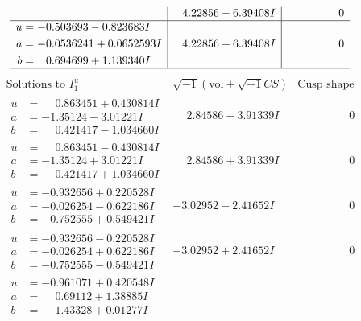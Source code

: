 \documentclass[1p]{elsarticle_modified}
\theoremstyle{definition}
\newcommand{\I}{\sqrt{-1}}
\begin{document}
$$\begin{array}{c|c|c}
 & \phantom{-}4.22856 - 6.39408 I & \phantom{-0.000000 } 0 \\ \hline\begin{aligned}
u &= -0.503693 - 0.823683 I \\
a &= -0.0536241 + 0.0652593 I \\
b &= \phantom{-}0.694699 + 1.139340 I\end{aligned}
 & \phantom{-}4.22856 + 6.39408 I & \phantom{-0.000000 } 0\\
 \hline 
 \end{array}$$\newpage$$\begin{array}{c|c|c}  
\text{Solutions to }I^u_{1}& \I (\text{vol} + \sqrt{-1}CS) & \text{Cusp shape}\\
 \hline 
\begin{aligned}
u &= \phantom{-}0.863451 + 0.430814 I \\
a &= -1.35124 - 3.01221 I \\
b &= \phantom{-}0.421417 - 1.034660 I\end{aligned}
 & \phantom{-}2.84586 - 3.91339 I & \phantom{-0.000000 } 0 \\ \hline\begin{aligned}
u &= \phantom{-}0.863451 - 0.430814 I \\
a &= -1.35124 + 3.01221 I \\
b &= \phantom{-}0.421417 + 1.034660 I\end{aligned}
 & \phantom{-}2.84586 + 3.91339 I & \phantom{-0.000000 } 0 \\ \hline\begin{aligned}
u &= -0.932656 + 0.220528 I \\
a &= -0.026254 - 0.622186 I \\
b &= -0.752555 + 0.549421 I\end{aligned}
 & -3.02952 - 2.41652 I & \phantom{-0.000000 } 0 \\ \hline\begin{aligned}
u &= -0.932656 - 0.220528 I \\
a &= -0.026254 + 0.622186 I \\
b &= -0.752555 - 0.549421 I\end{aligned}
 & -3.02952 + 2.41652 I & \phantom{-0.000000 } 0 \\ \hline\begin{aligned}
u &= -0.961071 + 0.420548 I \\
a &= \phantom{-}0.69112 + 1.38885 I \\
b &= \phantom{-}1.43328 + 0.01277 I\end{aligned}

\end{array}$$
\end{document}
